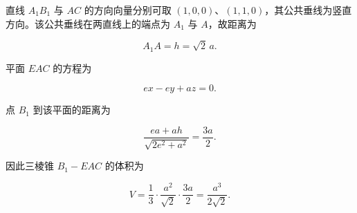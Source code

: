 \begin{answer}

直线 $A_1B_1$ 与 $AC$ 的方向向量分别可取 $(1,0,0)$、$(1,1,0)$，其公共垂线为竖直方向。该公共垂线在两直线上的端点为 $A_1$ 与 $A$，故距离为

\nopagebreak[4]
\[
A_1A=h=\sqrt2\,a.
\]


平面 $EAC$ 的方程为

\nopagebreak[4]
\[
ex-ey+az=0.
\]

点 $B_1$ 到该平面的距离为

\nopagebreak[4]
\[
\frac{ea+ah}{\sqrt{2e^2+a^2}}
=\frac{3a}{2}.
\]

因此三棱锥 $B_1-EAC$ 的体积为

\nopagebreak[4]
\[
V=\frac13\cdot\frac{a^2}{\sqrt2}\cdot\frac{3a}{2}
=\frac{a^3}{2\sqrt2}.
\]




\end{answer}
